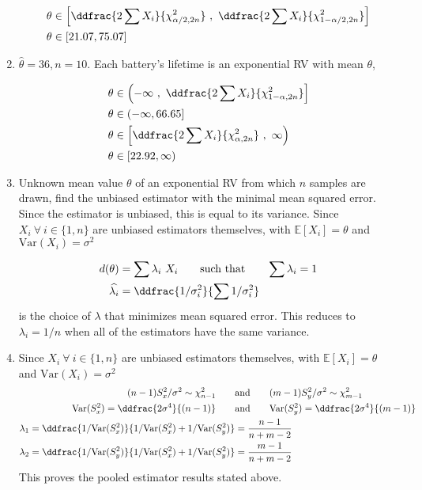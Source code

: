 \begin{enumerate}
		\begin{align}
			\theta &\in \left[\ddfrac{2 \sum X_i}{\chi^2_{\alpha/2, 2n}}\ ,\ \ddfrac{2 \sum X_i}{\chi^2_{1 - \alpha/2, 2n}}\right] \nonumber \\
			\theta &\in [21.07, 75.07]
		\end{align}
	
	
	\item $ \widehat{\theta}  = 36, n = 10$. Each battery's lifetime is an exponential RV with mean $ \theta $,
	
		\begin{align}
			\theta &\in \left(-\infty\ ,\ \ddfrac{2 \sum X_i}{\chi^2_{1 - \alpha, 2n}}\right] \nonumber \\
			\theta &\in (-\infty, 66.65] \\
			\theta &\in \left[\ddfrac{2 \sum X_i}{\chi^2_{\alpha, 2n}}\ ,\ \infty \right) \nonumber \\
			\theta &\in [22.92, \infty)
		\end{align}
	
	
	\item Unknown mean value $ \theta $ of an exponential RV from which $ n $ samples are drawn, find the unbiased estimator with the minimal mean squared error. Since the estimator is unbiased, this is equal to its variance.
	Since $ X_i \ \forall\ i \in \{1, n\}$ are unbiased estimators themselves, with $ \mathbb{E}[X_i] = \theta $ and $ \mathrm{Var}(X_i) = \sigma^2 $ 
	
		\begin{align}
			d(\theta) &= \sum \lambda_i\ X_i \qquad \text{such that} \qquad \sum \lambda_i = 1 \\
			\widehat{\lambda_i} &= \ddfrac{1/\sigma^2_i}{\sum 1/\sigma_i^2} 
		\end{align}
		is the choice of $ \lambda $ that minimizes mean squared error. This reduces to $ \lambda_i = 1/n $ when all of the estimators have the same variance.
	
	
	\item Since $ X_i \ \forall\ i \in \{1, n\}$ are unbiased estimators themselves, with $ \mathbb{E}[X_i] = \theta $ and $ \mathrm{Var}(X_i) = \sigma^2 $ \\
	
		\begin{align}
			(n-1)S_x^2 / \sigma^2 \sim \chi_{n-1}^2 \qquad &\text{and} \qquad (m-1)S_y^2 / \sigma^2 \sim \chi_{m-1}^2 \nonumber \\
			\mathrm{Var}(S_x^2) = \ddfrac{2\sigma^4}{(n-1)} \qquad &\text{and} \qquad \mathrm{Var}(S_y^2) = \ddfrac{2\sigma^4}{(m-1)} \nonumber \\
			\lambda_1 = \ddfrac{1/\mathrm{Var}(S_x^2)}{1/\mathrm{Var}(S_x^2) + 1/\mathrm{Var}(S_y^2)} &= \frac{n-1}{n+m-2} \\
			\lambda_2 = \ddfrac{1/\mathrm{Var}(S_y^2)}{1/\mathrm{Var}(S_x^2) + 1/\mathrm{Var}(S_y^2)} &= \frac{m-1}{n+m-2}
		\end{align}
		This proves the pooled estimator results stated above.
	

\end{enumerate}
